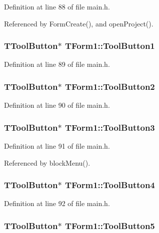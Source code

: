 Definition at line 88 of file main.h.

Referenced by FormCreate(), and openProject().\hypertarget{classTForm1_16b516ed8315336626ef543084163b91}{
\subsubsection[ToolButton1]{\setlength{\rightskip}{0pt plus 5cm}TToolButton$\ast$ {\bf TForm1::ToolButton1}}}
\label{classTForm1_16b516ed8315336626ef543084163b91}




Definition at line 89 of file main.h.\hypertarget{classTForm1_28ac629b0279cc5d013d72add3ed41ce}{
\subsubsection[ToolButton2]{\setlength{\rightskip}{0pt plus 5cm}TToolButton$\ast$ {\bf TForm1::ToolButton2}}}
\label{classTForm1_28ac629b0279cc5d013d72add3ed41ce}




Definition at line 90 of file main.h.\hypertarget{classTForm1_bc287a73f306ead728aa949a32876c0d}{
\subsubsection[ToolButton3]{\setlength{\rightskip}{0pt plus 5cm}TToolButton$\ast$ {\bf TForm1::ToolButton3}}}
\label{classTForm1_bc287a73f306ead728aa949a32876c0d}




Definition at line 91 of file main.h.

Referenced by blockMenu().\hypertarget{classTForm1_8d7c119ff7216835783eff16f3672135}{
\subsubsection[ToolButton4]{\setlength{\rightskip}{0pt plus 5cm}TToolButton$\ast$ {\bf TForm1::ToolButton4}}}
\label{classTForm1_8d7c119ff7216835783eff16f3672135}




Definition at line 92 of file main.h.\hypertarget{classTForm1_239ab7cfcbf5e165d1dd4c29d6d06542}{
\subsubsection[ToolButton5]{\setlength{\rightskip}{0pt plus 5cm}TToolButton$\ast$ {\bf TForm1::ToolButton5}}}
\label{classTForm1_239ab7cfcbf5e165d1dd4c29d6d06542}




